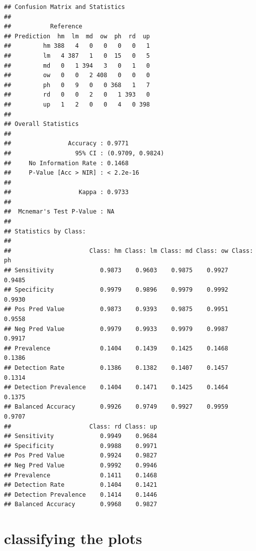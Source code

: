 \documentclass[
]{article}
\begin{document}
\begin{verbatim}
## Confusion Matrix and Statistics
## 
##           Reference
## Prediction  hm  lm  md  ow  ph  rd  up
##         hm 388   4   0   0   0   0   1
##         lm   4 387   1   0  15   0   5
##         md   0   1 394   3   0   1   0
##         ow   0   0   2 408   0   0   0
##         ph   0   9   0   0 368   1   7
##         rd   0   0   2   0   1 393   0
##         up   1   2   0   0   4   0 398
## 
## Overall Statistics
##                                           
##                Accuracy : 0.9771          
##                  95% CI : (0.9709, 0.9824)
##     No Information Rate : 0.1468          
##     P-Value [Acc > NIR] : < 2.2e-16       
##                                           
##                   Kappa : 0.9733          
##                                           
##  Mcnemar's Test P-Value : NA              
## 
## Statistics by Class:
## 
##                      Class: hm Class: lm Class: md Class: ow Class: ph
## Sensitivity             0.9873    0.9603    0.9875    0.9927    0.9485
## Specificity             0.9979    0.9896    0.9979    0.9992    0.9930
## Pos Pred Value          0.9873    0.9393    0.9875    0.9951    0.9558
## Neg Pred Value          0.9979    0.9933    0.9979    0.9987    0.9917
## Prevalence              0.1404    0.1439    0.1425    0.1468    0.1386
## Detection Rate          0.1386    0.1382    0.1407    0.1457    0.1314
## Detection Prevalence    0.1404    0.1471    0.1425    0.1464    0.1375
## Balanced Accuracy       0.9926    0.9749    0.9927    0.9959    0.9707
##                      Class: rd Class: up
## Sensitivity             0.9949    0.9684
## Specificity             0.9988    0.9971
## Pos Pred Value          0.9924    0.9827
## Neg Pred Value          0.9992    0.9946
## Prevalence              0.1411    0.1468
## Detection Rate          0.1404    0.1421
## Detection Prevalence    0.1414    0.1446
## Balanced Accuracy       0.9968    0.9827
\end{verbatim}

\section{classifying the plots}\label{classifying-the-plots-3}
\end{document}
